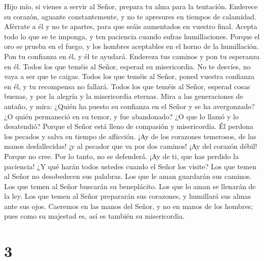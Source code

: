  Hijo mío, si vienes a servir al Señor, prepara tu alma
para la tentación.  Enderece su corazón, aguante
constantemente, y no te apresures en tiempos de calamidad.
 Aférrate a él y no te apartes, para que seáis aumentados
en vuestro final.  Acepta todo lo que se te imponga, y ten
paciencia cuando sufras humillaciones.  Porque el oro se
prueba en el fuego, y los hombres aceptables en el horno de la
humillación.  Pon tu confianza en él, y él te ayudará.
Endereza tus caminos y pon tu esperanza en él.  Todos los
que teméis al Señor, esperad su misericordia. No te desvíes, no vaya a
ser que te caigas.  Todos los que teméis al Señor, poned
vuestra confianza en él, y tu recompensa no fallará. 
Todos los que teméis al Señor, esperad cosas buenas, y por la alegría y
la misericordia eternas.  Mira a las generaciones de
antaño, y mira: ¿Quién ha puesto su confianza en el Señor y se ha
avergonzado? ¿O quién permaneció en su temor, y fue abandonado? ¿O que
lo llamó y lo desatendió?  Porque el Señor está lleno de
compasión y misericordia. Él perdona los pecados y salva en tiempo de
aflicción.  ¡Ay de los corazones temerosos, de las manos
desfallecidas! ¡y al pecador que va por dos caminos!  ¡Ay
del corazón débil! Porque no cree. Por lo tanto, no se defenderá.
 ¡Ay de ti, que has perdido la paciencia! ¿Y qué harán
todos ustedes cuando el Señor los visite?  Los que temen
al Señor no desobedecen sus palabras. Los que le aman guardarán sus
caminos.  Los que temen al Señor buscarán su beneplácito.
Los que lo aman se llenarán de la ley.  Los que temen al
Señor prepararán sus corazones, y humillará sus almas ante sus ojos.
 Caeremos en las manos del Señor, y no en manos de los
hombres; pues como su majestad es, así es también su misericordia.

\hypertarget{section-2}{%
\section{3}\label{section-2}}

